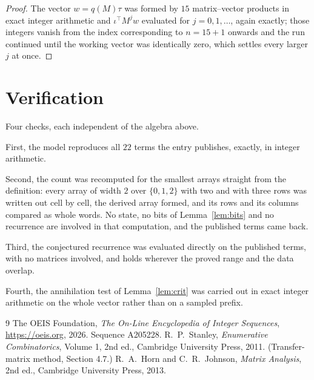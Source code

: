 \documentclass[11pt,a4paper]{article}
\theoremstyle{plain}
\theoremstyle{definition}
\begin{document}
\begin{proof}
The vector $w=q(M)\tau$ was formed by $15$ matrix--vector products in exact integer
arithmetic and $\iota^{\!\top}M^{j}w$ evaluated for $j=0,1,\dots$, again exactly; those
integers vanish from the index corresponding to $n=15+1$ onwards and the run continued
until the working vector was identically zero, which settles every larger $j$ at once.
\end{proof}

\section{Verification}

Four checks, each independent of the algebra above.

First, the model reproduces all $22$ terms the entry publishes, exactly, in integer
arithmetic.

Second, the count was recomputed for the smallest arrays straight from the definition: every
array of width $2$ over $\{0,1,2\}$ with two and with three rows was written out cell by cell,
the derived array formed, and its rows and its columns compared as whole words. No state, no
bits of Lemma~\ref{lem:bits} and no recurrence are involved in that computation, and the
published terms came back.

Third, the conjectured recurrence was evaluated directly on the published terms, with no
matrices involved, and holds wherever the proved range and the data overlap.

Fourth, the annihilation test of Lemma~\ref{lem:crit} was carried out in exact integer
arithmetic on the whole vector rather than on a sampled prefix.

\begin{thebibliography}{9}
 The OEIS Foundation, \emph{The On-Line Encyclopedia of Integer
Sequences}, \url{https://oeis.org}, 2026. Sequence A205228.
 R.~P.~Stanley, \emph{Enumerative Combinatorics}, Volume 1, 2nd ed.,
Cambridge University Press, 2011. (Transfer-matrix method, Section 4.7.)
 R.~A.~Horn and C.~R.~Johnson, \emph{Matrix Analysis}, 2nd ed., Cambridge
University Press, 2013.
\end{thebibliography}
\end{document}
